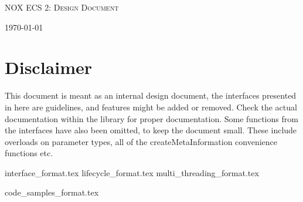 \documentclass[hidelinks]{article}
\begin{document}
\begin{titlepage}
    \centering
    {\scshape\LARGE NOX ECS 2: Design Document \par}
    \vfill
    {\large \today\par}
\end{titlepage}

\tableofcontents
\pagebreak


\section{Disclaimer}
This document is meant as an internal design document,
the interfaces presented in here are guidelines, and features might be added or removed.
Check the actual documentation within the library for proper documentation.
Some functions from the interfaces have also been omitted, to keep the document small. 
These include overloads on parameter types, all of the createMetaInformation convenience functions etc.

{interface_format.tex}
\pagebreak
{lifecycle_format.tex}
\pagebreak
{multi_threading_format.tex}
\pagebreak




\pagebreak
{code_samples_format.tex}
\end{document}
